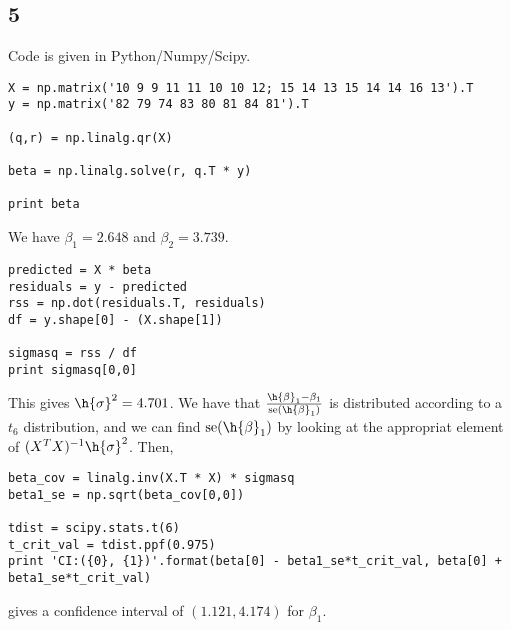 \documentclass{article}
\begin{document}
\subsection*{5}
Code is given in Python/Numpy/Scipy. 
\begin{verbatim}
X = np.matrix('10 9 9 11 11 10 10 12; 15 14 13 15 14 14 16 13').T
y = np.matrix('82 79 74 83 80 81 84 81').T

(q,r) = np.linalg.qr(X)

beta = np.linalg.solve(r, q.T * y)

print beta
\end{verbatim}
We have $\beta_1=2.648$ and $\beta_2=3.739$.
\begin{verbatim}
predicted = X * beta
residuals = y - predicted
rss = np.dot(residuals.T, residuals)
df = y.shape[0] - (X.shape[1])

sigmasq = rss / df
print sigmasq[0,0]
\end{verbatim}
This gives $\h{\sigma}^2=4.701$.
We have that $\frac{\h{\beta}_1-\beta_1}{\text{se}(\h{\beta}_1)}$ is distributed according to a $t_6$ distribution, and we can find $\text{se}(\h{\beta}_1)$ by looking at the appropriat element of $(X^TX)^{-1}\h{\sigma}^2$. Then,
\begin{verbatim}
beta_cov = linalg.inv(X.T * X) * sigmasq
beta1_se = np.sqrt(beta_cov[0,0])

tdist = scipy.stats.t(6)
t_crit_val = tdist.ppf(0.975)
print 'CI:({0}, {1})'.format(beta[0] - beta1_se*t_crit_val, beta[0] + beta1_se*t_crit_val)
\end{verbatim}
gives a confidence interval of $(1.121,4.174)$ for $\beta_1$.
\end{document}
